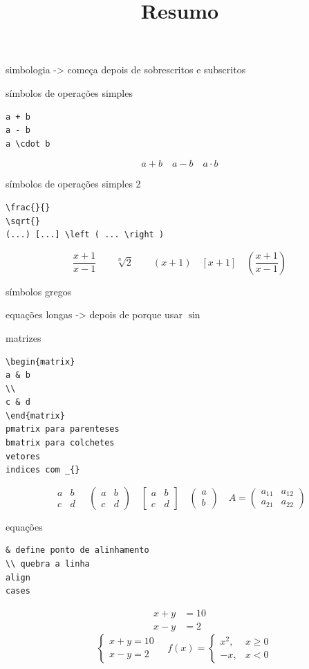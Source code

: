 \documentclass{article}
\title{Resumo}
\begin{document}
simbologia -> começa depois de sobrescritos e subscritos

símbolos de operações simples
\begin{lstlisting}
a + b
a - b
a \cdot b
\end{lstlisting}
\[
  a + b
  \quad
  a - b
  \quad
  a \cdot b
\]

símbolos de operações simples 2
\begin{lstlisting}
\frac{}{}
\sqrt{}
(...) [...] \left ( ... \right )
\end{lstlisting}
\[
  \frac{x+1}{x-1} \qquad
  \sqrt[n]{2} \qquad
  (x+1) \quad [x+1] \quad\left ( \frac{x+1}{x-1} \right)
\]

símbolos gregos

equações longas -> depois de porque usar $\sin$

matrizes
\begin{lstlisting}
\begin{matrix}
a & b
\\
c & d
\end{matrix}
pmatrix para parenteses
bmatrix para colchetes
vetores
indices com _{}
\end{lstlisting}
\[
  \begin{matrix}
  a & b
  \\
  c & d
  \end{matrix}
  \quad
  \begin{pmatrix}
  a & b
  \\
  c & d
  \end{pmatrix}
  \quad
  \begin{bmatrix}
  a & b
  \\
  c & d
  \end{bmatrix}
  \quad
  \begin{pmatrix}
  a
  \\
  b
  \end{pmatrix}
  \quad
  A =
  \begin{pmatrix}
  a_{11} & a_{12}
  \\
  a_{21} & a_{22}
  \end{pmatrix}
\]

equações
\begin{lstlisting}
& define ponto de alinhamento
\\ quebra a linha
align
cases
\end{lstlisting}

  \begin{align*}
  x + y &= 10
  \\
  x-y &= 2
  \end{align*}
\[
  \quad
  \begin{cases}
  x + y = 10
  \\
  x - y = 2
  \end{cases}
  \quad
  f(x) = 
  \begin{cases}
  x^2, & x\geq 0
  \\
  -x, & x<0
  \end{cases}
\]
\end{document}
